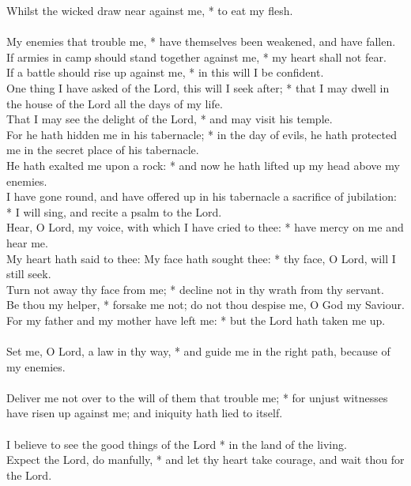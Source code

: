 \begin{Parallel}[v]{\colw}{\colx}
{{Whilst the wicked draw near against me, * to eat my flesh.\\ \\
My enemies that trouble me, * have themselves been weakened, and have fallen.\\
If armies in camp should stand together against me, * my heart shall not fear.\\
If a battle should rise up against me, * in this will I be confident.\\
One thing I have asked of the Lord, this will I seek after; * that I may dwell in the house of the Lord all the days of my life.\\
That I may see the delight of the Lord, * and may visit his temple.\\
For he hath hidden me in his tabernacle; * in the day of evils, he hath protected me in the secret place of his tabernacle.\\
He hath exalted me upon a rock: * and now he hath lifted up my head above my enemies.\\
I have gone round, and have offered up in his tabernacle a sacrifice of jubilation: * I will sing, and recite a psalm to the Lord.\\
Hear, O Lord, my voice, with which I have cried to thee: * have mercy on me and hear me.\\
My heart hath said to thee: My face hath sought thee: * thy face, O Lord, will I still seek.\\
Turn not away thy face from me; * decline not in thy wrath from thy servant.\\
Be thou my helper, * forsake me not; do not thou despise me, O God my Saviour.\\
For my father and my mother have left me: * but the Lord hath taken me up.\\ \\
Set me, O Lord, a law in thy way, * and guide me in the right path, because of my enemies.\\ \\
Deliver me not over to the will of them that trouble me; * for unjust witnesses have risen up against me; and iniquity hath lied to itself.\\ \\
I believe to see the good things of the Lord * in the land of the living.\\
Expect the Lord, do manfully, * and let thy heart take courage, and wait thou for the Lord.}}

\end{Parallel}



